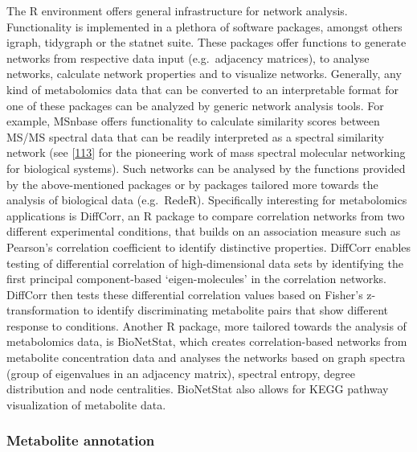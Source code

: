 \documentclass[]{article}
\begin{document}
The R environment offers general infrastructure for network analysis. Functionality is implemented in a plethora of software packages, amongst others igraph, tidygraph or the statnet suite. These packages offer functions to generate networks from respective data input (e.g.~adjacency matrices), to analyse networks, calculate network properties and to visualize networks. Generally, any kind of metabolomics data that can be converted to an interpretable format for one of these packages can be analyzed by generic network analysis tools. For example, MSnbase offers functionality to calculate similarity scores between MS/MS spectral data that can be readily interpreted as a spectral similarity network (see {[}\protect\hyperlink{ref-watrous_2012}{113}{]} for the pioneering work of mass spectral molecular networking for biological systems). Such networks can be analysed by the functions provided by the above-mentioned packages or by packages tailored more towards the analysis of biological data (e.g.~RedeR). Specifically interesting for metabolomics applications is DiffCorr, an R package to compare correlation networks from two different experimental conditions, that builds on an association measure such as Pearson's correlation coefficient to identify distinctive properties. DiffCorr enables testing of differential correlation of high-dimensional data sets by identifying the first principal component-based `eigen-molecules' in the correlation networks. DiffCorr then tests these differential correlation values based on Fisher's z-transformation to identify discriminating metabolite pairs that show different response to conditions. Another R package, more tailored towards the analysis of metabolomics data, is BioNetStat, which creates correlation-based networks from metabolite concentration data and analyses the networks based on graph spectra (group of eigenvalues in an adjacency matrix), spectral entropy, degree distribution and node centralities. BioNetStat also allows for KEGG pathway visualization of metabolite data.

\hypertarget{metabolite-annotation}{%
\subsubsection{Metabolite annotation}\label{metabolite-annotation}}
\end{document}
